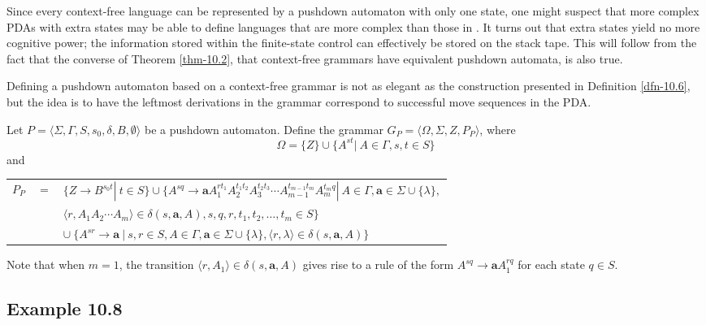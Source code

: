 Since every context-free language can be represented by a pushdown automaton
with only one state, one might suspect that more complex PDAs with extra states
may be able to define languages that are more complex than those in \CSIG. It
turns out that extra states yield no more cognitive power; the information
stored within the finite-state control can effectively be stored on the stack
tape. This will follow from the fact that the converse of Theorem \ref{thm-10.2}, that
context-free grammars have equivalent pushdown automata, is also true.

Defining a pushdown automaton based on a context-free grammar is not as elegant
as the construction presented in Definition \ref{dfn-10.6}, but the idea is to have the
leftmost derivations in the grammar correspond to successful move sequences in
the PDA.

\begin{dfn}\label{dfn-10.7}
Let $P=\langle\Sigma,\Gamma,S,s_0,\delta,B,\emptyset\rangle$ be a pushdown
automaton. Define the grammar $G_P=\langle\Omega,\Sigma,Z,P_P\rangle$, where
\[ \Omega=\{Z\}\cup\{A^{st}|\ A\in\Gamma,s,t\in S\} \]
and
\begin{center}\begin{tabular}{r@{ }c@{ }l}
$P_P$ & $=$ & $\{Z\rightarrow B^{s_0t}|\ t\in S\}\cup\{A^{sq}\rightarrow\pmb{a}A^{rt_1}_1
	A^{t_1t_2}_2A^{t_2t_3}_3\cdots A^{t_{m-1}t_m}_{m-1}A^{t_mq}_m|\ A\in\Gamma,
	\pmb{a}\in\Sigma\cup\{\lambda\},$ \\
&& $\langle r,A_1A_2\cdots A_m\rangle\in\delta(s,\pmb{a},A),s,q,r,t_1,t_2,\ldots,
	t_m\in S\}$ \\
&& $\cup\ \{A^{sr}\rightarrow\pmb{a}\ |\ s,r\in S,A\in\Gamma,\pmb{a}\in\Sigma\cup\{
	\lambda\},\langle r,\lambda\rangle\in\delta(s,\pmb{a},A)\}$
\end{tabular}\end{center}
\end{dfn}

Note that when $m=1$, the transition $\langle r,A_1\rangle\in\delta(s,\pmb{a},A)$
gives rise to a rule of the form $A^{sq}\rightarrow\pmb{a}A^{rq}_1$ for each
state $q\in S$.

\subsection*{Example 10.8}

